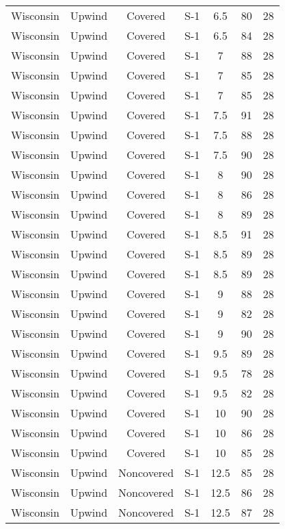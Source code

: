 \documentclass{article}
\begin{document}
\begin{longtable}[H]{ccccccc}
Wisconsin & Upwind   & Covered     & S-1 & 6.5  & 80  & 28 \\
Wisconsin & Upwind   & Covered     & S-1 & 6.5  & 84  & 28 \\
Wisconsin & Upwind   & Covered     & S-1 & 7    & 88  & 28 \\
Wisconsin & Upwind   & Covered     & S-1 & 7    & 85  & 28 \\
Wisconsin & Upwind   & Covered     & S-1 & 7    & 85  & 28 \\
Wisconsin & Upwind   & Covered     & S-1 & 7.5  & 91  & 28 \\
Wisconsin & Upwind   & Covered     & S-1 & 7.5  & 88  & 28 \\
Wisconsin & Upwind   & Covered     & S-1 & 7.5  & 90  & 28 \\
Wisconsin & Upwind   & Covered     & S-1 & 8    & 90  & 28 \\
Wisconsin & Upwind   & Covered     & S-1 & 8    & 86  & 28 \\
Wisconsin & Upwind   & Covered     & S-1 & 8    & 89  & 28 \\
Wisconsin & Upwind   & Covered     & S-1 & 8.5  & 91  & 28 \\
Wisconsin & Upwind   & Covered     & S-1 & 8.5  & 89  & 28 \\
Wisconsin & Upwind   & Covered     & S-1 & 8.5  & 89  & 28 \\
Wisconsin & Upwind   & Covered     & S-1 & 9    & 88  & 28 \\
Wisconsin & Upwind   & Covered     & S-1 & 9    & 82  & 28 \\
Wisconsin & Upwind   & Covered     & S-1 & 9    & 90  & 28 \\
Wisconsin & Upwind   & Covered     & S-1 & 9.5  & 89  & 28 \\
Wisconsin & Upwind   & Covered     & S-1 & 9.5  & 78  & 28 \\
Wisconsin & Upwind   & Covered     & S-1 & 9.5  & 82  & 28 \\
Wisconsin & Upwind   & Covered     & S-1 & 10   & 90  & 28 \\
Wisconsin & Upwind   & Covered     & S-1 & 10   & 86  & 28 \\
Wisconsin & Upwind   & Covered     & S-1 & 10   & 85  & 28 \\
Wisconsin & Upwind   & Noncovered & S-1 & 12.5 & 85  & 28 \\
Wisconsin & Upwind   & Noncovered & S-1 & 12.5 & 86  & 28 \\
Wisconsin & Upwind   & Noncovered & S-1 & 12.5 & 87  & 28 \\

\end{longtable}
\end{document}

